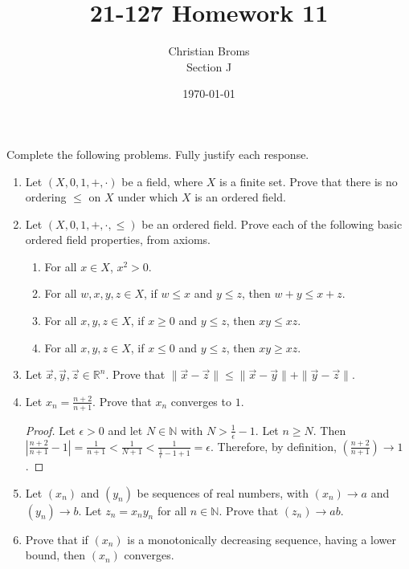 \documentclass[12pt]{article}
\newcommand{\R}{\mathbb{R}}
\newcommand{\N}{\mathbb{N}}
\begin{document}
\title{21-127 Homework 11
}
\author{Christian Broms \\ Section J}
\date{\today}
\maketitle
Complete the following problems. Fully justify each response.


\begin{enumerate}

\item Let $(X, 0, 1, +, \cdot)$ be a field, where $X$ is a finite set. Prove that there is no ordering $\leq$ on $X$ under which $X$ is an ordered field.

\item Let $(X, 0, 1, +, \cdot, \leq)$ be an ordered field. Prove each of the following basic ordered field properties, from axioms.
\begin{enumerate}
\item For all $x\in X$, $x^2>0$.
\item For all $w, x, y, z\in X$, if $w\leq x$ and $y\leq z$, then $w+y\leq x+z$.
\item For all $x, y, z\in X$, if $x\geq 0$ and $y\leq z$, then $xy\leq xz$.
\item For all $x, y, z\in X$, if $x\leq 0$ and $y\leq z$, then $xy\geq xz$.
\end{enumerate}

\item Let $\vec{x}, \vec{y}, \vec{z}\in \R^n$. Prove that $\|\vec{x}-\vec{z}\|\leq \|\vec{x}-\vec{y}\|+\|\vec{y}-\vec{z}\|$.

\item Let $x_n = \frac{n+2}{n+1}$. Prove that $x_n$ converges to $1$.

\begin{proof}
Let $\epsilon > 0$ and let $N \in \N$ with $N > \frac{1}{\epsilon} - 1$. Let $n \geq N$. Then $|\frac{n+2}{n+1} - 1| = \frac{1}{n+1} < \frac{1}{N + 1} < \frac{1}{\frac{1}{\epsilon} - 1 + 1} = \epsilon$. Therefore, by definition, $(\frac{n+2}{n+1}) \to 1$.
\end{proof}

\item Let $(x_n)$ and $(y_n)$ be sequences of real numbers, with $(x_n)\to a$ and $(y_n)\to b$. Let $z_n=x_ny_n$ for all $n\in \N$. Prove that $(z_n)\to ab$.

\item Prove that if $(x_n)$ is a monotonically decreasing sequence, having a lower bound, then $(x_n)$ converges.


\end{enumerate}
\end{document}

